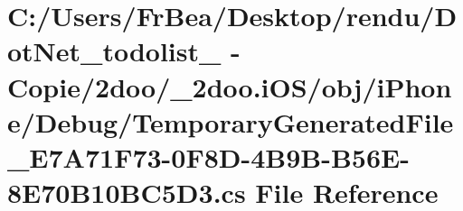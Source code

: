 \hypertarget{i_o_s_2obj_2i_phone_2_debug_2_temporary_generated_file___e7_a71_f73-0_f8_d-4_b9_b-_b56_e-8_e70_b10_b_c5_d3_8cs}{
\section{C:/Users/FrBea/Desktop/rendu/DotNet\_\-todolist\_ - Copie/2doo/\_\-2doo.iOS/obj/iPhone/Debug/TemporaryGeneratedFile\_\-E7A71F73-0F8D-4B9B-B56E-8E70B10BC5D3.cs File Reference}
\label{i_o_s_2obj_2i_phone_2_debug_2_temporary_generated_file___e7_a71_f73-0_f8_d-4_b9_b-_b56_e-8_e70_b10_b_c5_d3_8cs}
}
